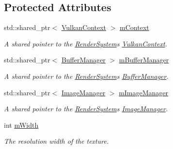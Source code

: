 \subsection*{Protected Attributes}
\begin{DoxyCompactItemize}
\item 
\mbox{\label{class_texture_a400f584bf6d9c42946c560eb7e68291e}} 
std\+::shared\+\_\+ptr$<$ \mbox{\hyperlink{class_vulkan_context}{Vulkan\+Context}} $>$ \mbox{\hyperlink{class_texture_a400f584bf6d9c42946c560eb7e68291e}{m\+Context}}
\begin{DoxyCompactList}\small\item\em A shared pointer to the \mbox{\hyperlink{class_render_system}{Render\+System}}\textquotesingle{}s \mbox{\hyperlink{class_vulkan_context}{Vulkan\+Context}}. \end{DoxyCompactList}\item 
\mbox{\label{class_texture_a11f2e25c15d0e11b7469eb7c24497a04}} 
std\+::shared\+\_\+ptr$<$ \mbox{\hyperlink{class_buffer_manager}{Buffer\+Manager}} $>$ \mbox{\hyperlink{class_texture_a11f2e25c15d0e11b7469eb7c24497a04}{m\+Buffer\+Manager}}
\begin{DoxyCompactList}\small\item\em A shared pointer to the \mbox{\hyperlink{class_render_system}{Render\+System}}\textquotesingle{}s \mbox{\hyperlink{class_buffer_manager}{Buffer\+Manager}}. \end{DoxyCompactList}\item 
\mbox{\label{class_texture_a976fb90446c3b4b919274ac1442c5d58}} 
std\+::shared\+\_\+ptr$<$ \mbox{\hyperlink{class_image_manager}{Image\+Manager}} $>$ \mbox{\hyperlink{class_texture_a976fb90446c3b4b919274ac1442c5d58}{m\+Image\+Manager}}
\begin{DoxyCompactList}\small\item\em A shared pointer to the \mbox{\hyperlink{class_render_system}{Render\+System}}\textquotesingle{}s \mbox{\hyperlink{class_image_manager}{Image\+Manager}}. \end{DoxyCompactList}\item 
\mbox{\label{class_texture_a0e007f4b4f1a314e5b0dae1402a13afb}} 
int \mbox{\hyperlink{class_texture_a0e007f4b4f1a314e5b0dae1402a13afb}{m\+Width}}
\begin{DoxyCompactList}\small\item\em The resolution width of the texture. \end{DoxyCompactList}\item 

\end{DoxyCompactItemize}
